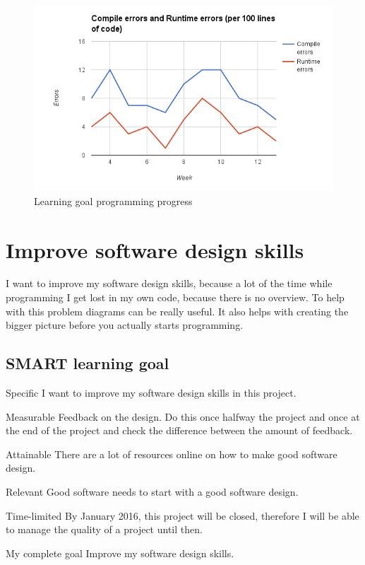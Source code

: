 \documentclass[12pt]{article}
\begin{document}
	\begin{figure}[ht]
		
		\centering
		\includegraphics[width=\textwidth, keepaspectratio=true]{personaldossiers/LearningGoalProgrammingMartijn.png}
		\caption{Learning goal programming progress}\label{lgprogramming}
	\end{figure}
	
	\clearpage
	\section{Improve software design skills}
	
	I want to improve my software design skills, because a lot of the time while programming I get lost in my own code, because there is no overview. To help with this problem diagrams can be really useful. It also helps with creating the bigger picture before you actually starts programming.
	
	\subsection{SMART learning goal}
	\begin{SMART}
	    \item[Specific] I want to improve my software design skills in this project.
	    \item[Measurable] Feedback on the design. Do this once halfway the project and once at the end of the project and check the difference between the amount of feedback.
	    \item[Attainable] There are a lot of resources online on how to make good software design.
	    \item[Relevant] Good software needs to start with a good software design.
	    \item[Time-limited] By January 2016, this project will be closed, therefore I will be able to manage the quality of a project until then.
	    \item[My complete goal] Improve my software design skills.
	\end{SMART}
	
\end{document}
